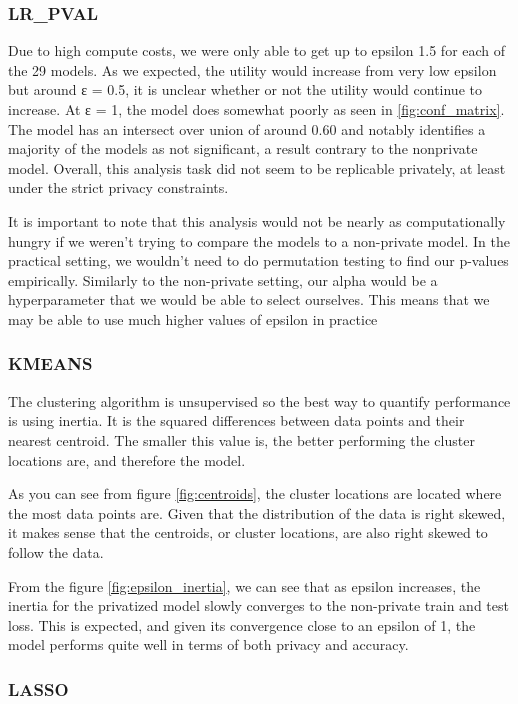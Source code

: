 \documentclass[12pt,letterpaper]{article}
\begin{document}
\subsubsection{LR\_PVAL}
Due to high compute costs, we were only able to get up to epsilon 1.5 for each of the 29 models. As we expected, the utility would increase from very low epsilon but around ε = 0.5, it is unclear whether or not the utility would continue to increase. At ε = 1, the model does somewhat poorly as seen in \ref{fig:conf_matrix}. The model has an intersect over union of around 0.60 and notably identifies a majority of the models as not significant, a result contrary to the nonprivate model. Overall, this analysis task did not seem to be replicable privately, at least under the strict privacy constraints.

It is important to note that this analysis would not be nearly as computationally hungry if we weren't trying to compare the models to a non-private model. In the practical setting, we wouldn't need to do permutation testing to find our p-values empirically. Similarly to the non-private setting, our alpha would be a hyperparameter that we would be able to select ourselves. This means that we may be able to use much higher values of epsilon in practice

\subsubsection{KMEANS}
The clustering algorithm is unsupervised so the best way to quantify performance is using inertia. It is the squared differences between data points and their nearest centroid. The smaller this value is, the better performing the cluster locations are, and therefore the model. 

As you can see from figure \ref{fig:centroids}, the cluster locations are located where the most data points are. Given that the distribution of the data is right skewed, it makes sense that the centroids, or cluster locations, are also right skewed to follow the data. 

From the figure \ref{fig:epsilon_inertia}, we can see that as epsilon increases, the inertia for the privatized model slowly converges to the non-private train and test loss. This is expected, and given its convergence close to an epsilon of 1, the model performs quite well in terms of both privacy and accuracy.

\subsubsection{LASSO}
\end{document}
